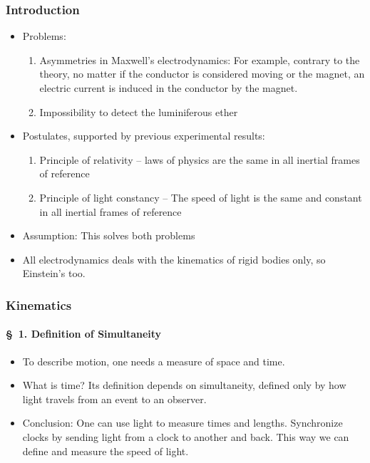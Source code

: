 \documentclass[pagesize,headsepline,10pt,parskip=half]{scrreprt}
\begin{document}
        \subsubsection{Introduction}
          \begin{itemize}
            \item Problems:
              \begin{enumerate}
                \item Asymmetries in Maxwell’s electrodynamics:
                  For example, contrary to the theory, no matter if the conductor is considered
                  moving or the magnet, an electric current is induced in the conductor by the magnet.
                \item Impossibility to detect the luminiferous ether
              \end{enumerate}
            \item Postulates, supported by previous experimental results:
              \begin{enumerate}
                \item Principle of relativity – laws of physics are the same in all inertial frames of reference
                \item Principle of light constancy – The speed of light is the same and constant in all inertial frames of reference
              \end{enumerate}
            \item Assumption: This solves both problems
            \item All electrodynamics deals with the kinematics of rigid bodies only, so Einstein’s too.
          \end{itemize}

        \subsubsection{Kinematics}
          \paragraph{§ 1. Definition of Simultaneity}
            \begin{itemize}
              \item To describe motion, one needs a measure of space and time.
              \item What is time?  Its definition depends on simultaneity,
                defined only by how light travels from an event to an observer.
              \item Conclusion: One can use light to measure times and lengths.
                Synchronize clocks by sending light from a clock to another and back.
                This way we can define and measure the speed of light.
            \end{itemize}
\end{document}
